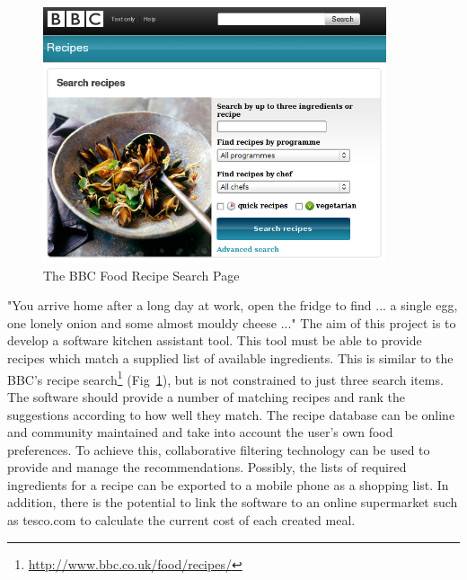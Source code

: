 \begin{figure}
\includegraphics[width=0.9\textwidth]{screenshot_bbc_recipes}
\caption{The BBC Food Recipe Search Page}
\label{fig:bbc_food}
\end{figure}

"You arrive home after a long day at work, open the fridge to find ... a single egg, one lonely onion and some almost mouldy cheese ..." The aim of this project is to develop a software kitchen assistant tool. This tool must be able to provide recipes which match a supplied list of available ingredients. This is similar to the BBC's recipe search\footnote{\url{http://www.bbc.co.uk/food/recipes/}} (Fig~\ref{fig:bbc_food}), but is not constrained to just three search items. The software should provide a number of matching recipes and rank the suggestions according to how well they match. The recipe database can be online and community maintained and take into account the user's own food preferences. To achieve this, collaborative filtering technology can be used to provide and manage the recommendations. Possibly, the lists of required ingredients for a recipe can be exported to a mobile phone as a shopping list. In addition, there is the potential to link the software to an online supermarket such as tesco.com to calculate the current cost of each created meal.
